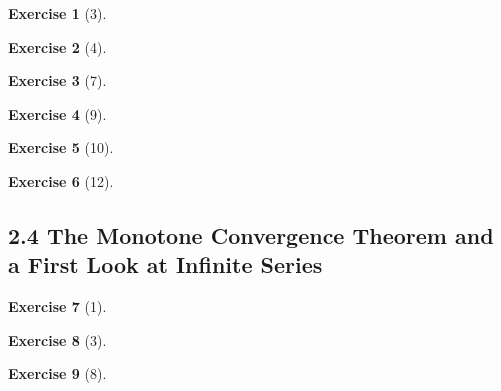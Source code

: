 \documentclass{amsart}
\theoremstyle{definition}
\newtheorem*{exercise}{Exercise}
\begin{document}
\begin{exercise}[3]
\end{exercise}

\begin{exercise}[4]
\end{exercise}

\begin{exercise}[7]
\end{exercise}

\begin{exercise}[9]
\end{exercise}

\begin{exercise}[10]
\end{exercise}

\begin{exercise}[12]
\end{exercise}

\subsection*{2.4 The Monotone Convergence Theorem and a First Look at Infinite
Series}

\begin{exercise}[1]
\end{exercise}

\begin{exercise}[3]
\end{exercise}

\begin{exercise}[8]
\end{exercise}
\end{document}
